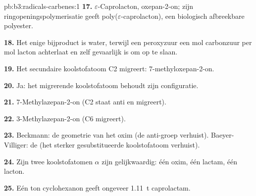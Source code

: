 \begin{solution}{pb:b3:radicals-carbenes:1}
\textbf{17.} $\varepsilon$-Caprolacton, oxepan-2-on; zijn ringopeningspolymerisatie geeft
poly($\varepsilon$-caprolacton), een biologisch afbreekbare polyester.

\textbf{18.} Het enige bijproduct is water, terwijl een peroxyzuur een mol
carbonzuur per mol lacton achterlaat en zelf gevaarlijk is om op te
slaan.

\textbf{19.} Het secundaire koolstofatoom C2 migreert: 7-methyloxepan-2-on.

\textbf{20.} Ja: het migrerende koolstofatoom behoudt zijn configuratie.

\textbf{21.} 7-Methylazepan-2-on (C2 staat anti en migreert).

\textbf{22.} 3-Methylazepan-2-on (C6 migreert).

\textbf{23.} Beckmann: de geometrie van het oxim (de anti-groep verhuist).
Baeyer-Villiger: de  (het sterker gesubstitueerde
koolstofatoom verhuist).

\textbf{24.} Zijn twee koolstofatomen $\alpha$ zijn gelijkwaardig: één oxim, één lactam, één lacton.

\textbf{25.} Eén ton cyclohexanon geeft ongeveer \qty{1.11}{t} caprolactam.
\end{solution}
